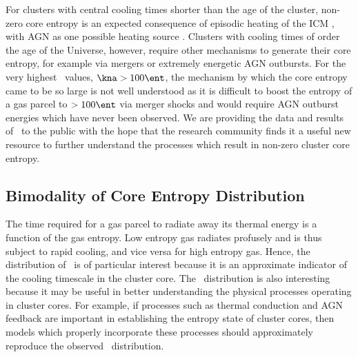 For clusters with central cooling times shorter than the age of the
cluster, non-zero core entropy is an expected consequence of episodic
heating of the ICM \citep{agnframework}, with AGN as one possible
heating source \citep{1997MNRAS.288..355B, 2000ApJ...532...17L,
2001Natur.414..425V, 2001ApJ...549..832S, 2002MNRAS.332..729C,
2002Natur.418..301B, 2002MNRAS.331..545B, 2002MNRAS.333..145N,
2002ApJ...581..223R, 2002MNRAS.335..610A, 2004MNRAS.348.1105O,
2004ApJ...613..811M, 2004ApJ...615..681R, 2004ApJ...617..896H,
2004MNRAS.355..995D, 2005ApJ...622..847S, pizzolato05,
2006ApJ...643..120B, 2006ApJ...638..659M}. Clusters with cooling times
of order the age of the Universe, however, require other mechanisms to
generate their core entropy, for example via mergers or extremely
energetic AGN outbursts. For the very highest \kna\ values, $\kna >
100 \ent$, the mechanism by which the core entropy came to be so large
is not well understood as it is difficult to boost the entropy of a
gas parcel to $> 100 \ent$ via merger shocks
\citep{2008MNRAS.386.1309M} and would require AGN outburst energies
which have never been observed. We are providing the data and results
of \accept\ to the public with the hope that the research community
finds it a useful new resource to further understand the processes
which result in non-zero cluster core entropy.

\subsection{Bimodality of Core Entropy Distribution}
\label{sec:entsuppbimod}

The time required for a gas parcel to radiate away its thermal energy
is a function of the gas entropy. Low entropy gas radiates profusely
and is thus subject to rapid cooling, and vice versa for high entropy
gas. Hence, the distribution of \kna\ is of particular interest
because it is an approximate indicator of the cooling timescale in the
cluster core. The \kna\ distribution is also interesting because it
may be useful in better understanding the physical processes operating
in cluster cores. For example, if processes such as thermal conduction
and AGN feedback are important in establishing the entropy state of
cluster cores, then models which properly incorporate these processes
should approximately reproduce the observed \kna\ distribution.

